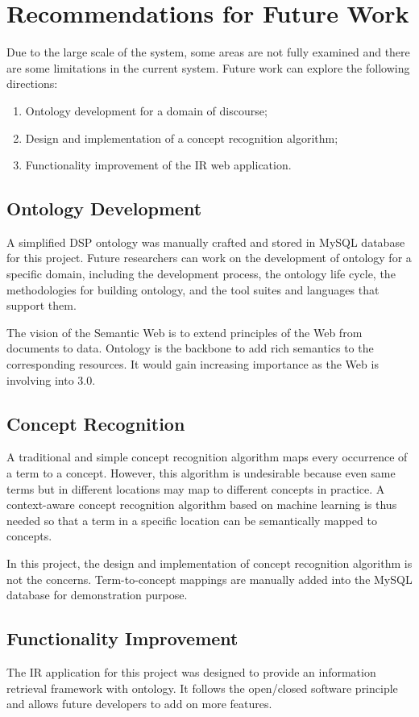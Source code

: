 \section{Recommendations for Future Work}
Due to the large scale of the system, some areas are not fully examined and there are some limitations in the current system. Future work can explore the following directions: 

\begin{enumerate}
\item Ontology development for a domain of discourse;
\item Design and implementation of a concept recognition algorithm;
\item Functionality improvement of the IR web application.
\end{enumerate}

\subsection{Ontology Development}
A simplified DSP ontology was manually crafted and stored in MySQL database for this project. Future researchers can work on the development of ontology for a specific domain, including the development process, the ontology life cycle, the methodologies for building ontology, and the tool suites and languages that support them.

The vision of the Semantic Web is to extend principles of the Web from documents to data. Ontology is the backbone to add rich semantics to the corresponding resources. It would gain increasing importance as the Web is involving into 3.0.

\subsection{Concept Recognition}
A traditional and simple concept recognition algorithm maps every occurrence of a term to a concept. However, this algorithm is undesirable because even same terms but in different locations may map to different concepts in practice. A context-aware concept recognition algorithm based on machine learning is thus needed so that a term in a specific location can be semantically mapped to concepts.

In this project, the design and implementation of concept recognition algorithm is not the concerns. Term-to-concept mappings are manually added into the MySQL database for demonstration purpose.

\subsection{Functionality Improvement}
The IR application for this project was designed to provide an information retrieval framework with ontology. It follows the open/closed software principle and allows future developers to add on more features.

